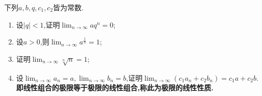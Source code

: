 \begin{example}
    下列$a,b,q,c_1,c_2$皆为常数.

    \begin{enumerate}
        \item 设$|q|<1$,证明$\lim_{n \to \infty} aq^n=0$;
        \item 设$a>0$,则$\lim_{n \to \infty} a^{\frac1n}=1$;
        \item 证明$\lim_{n \to \infty} \sqrt[n]{n}=1$;
        \item 设$\lim_{n \to \infty} a_n=a, \lim_{n \to \infty} b_n=b$,证明$\lim_{n \to \infty} (c_1a_n+c_2b_n)=c_1a+c_2b$.\textbf{即线性组合的极限等于极限的线性组合,称此为极限的线性性质.}
    \end{enumerate}
\end{example}


